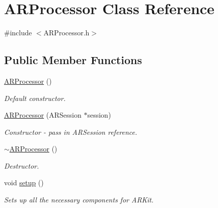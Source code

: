 \hypertarget{class_a_r_processor}{}\section{A\+R\+Processor Class Reference}
\label{class_a_r_processor}


{\ttfamily \#include $<$A\+R\+Processor.\+h$>$}

\subsection*{Public Member Functions}
\begin{DoxyCompactItemize}
\item 
\mbox{\label{class_a_r_processor_a8d82301cb64ffc49af9219daeabc9347}} 
\hyperlink{class_a_r_processor_a8d82301cb64ffc49af9219daeabc9347}{A\+R\+Processor} ()
\begin{DoxyCompactList}\small\item\em Default constructor. \end{DoxyCompactList}\item 
\mbox{\label{class_a_r_processor_a2dda14173a82870379c111d13a0562d6}} 
\hyperlink{class_a_r_processor_a2dda14173a82870379c111d13a0562d6}{A\+R\+Processor} (A\+R\+Session $\ast$session)
\begin{DoxyCompactList}\small\item\em Constructor -\/ pass in A\+R\+Session reference. \end{DoxyCompactList}\item 
\mbox{\label{class_a_r_processor_a9bd83aa6f017e308d1e55e709621ae84}} 
\hyperlink{class_a_r_processor_a9bd83aa6f017e308d1e55e709621ae84}{$\sim$\+A\+R\+Processor} ()
\begin{DoxyCompactList}\small\item\em Destructor. \end{DoxyCompactList}\item 
\mbox{\label{class_a_r_processor_a5fed271e6afd105006cdd3c263c6ba4d}} 
void \hyperlink{class_a_r_processor_a5fed271e6afd105006cdd3c263c6ba4d}{setup} ()
\begin{DoxyCompactList}\small\item\em Sets up all the necessary components for A\+R\+Kit. \end{DoxyCompactList}\item 

\end{DoxyCompactItemize}
